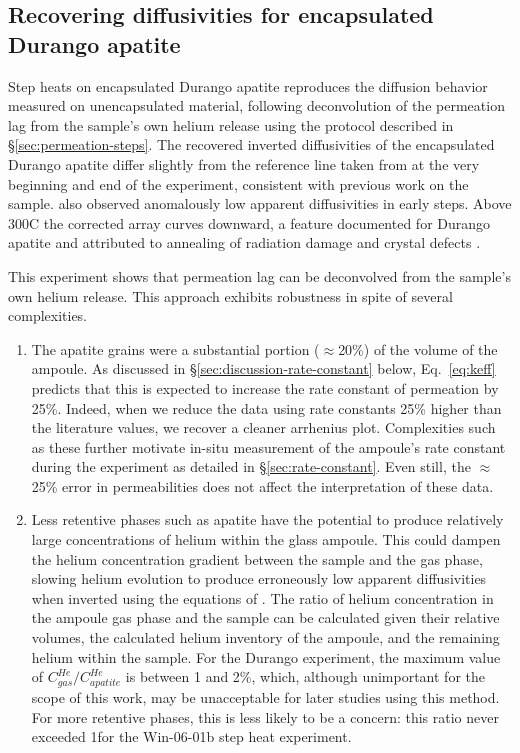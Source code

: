\subsection{Recovering diffusivities for encapsulated Durango apatite}\label{sec:recover-arrhenius}
Step heats on encapsulated Durango apatite reproduces the diffusion behavior measured on unencapsulated material, following deconvolution of the permeation lag from the sample's own helium release using the protocol described in \S\ref{sec:permeation-steps}. 
The recovered inverted diffusivities of the encapsulated Durango apatite differ slightly from the reference line taken from \citet{farley2000} at the very beginning and end of the experiment, consistent with previous work on the sample. \citet{farley2000} also observed anomalously low apparent diffusivities in early steps. Above 300\textdegree C the corrected array curves downward, a feature documented for Durango apatite and attributed to annealing of radiation damage and crystal defects \citep{wolf1996,farley2000,shuster2006}. 

This experiment shows that permeation lag can be deconvolved from the sample's own helium release. This approach exhibits robustness in spite of several complexities.
\begin{enumerate}
\item The apatite grains were a substantial portion ($\approx$20\%) of the volume of the ampoule. As discussed in \S\ref{sec:discussion-rate-constant} below, Eq.~\eqref{eq:keff} predicts that this is expected to increase the rate constant of permeation by 25\%. Indeed, when we reduce the data using rate constants 25\% higher than the literature values, we recover a cleaner arrhenius plot. Complexities such as these further motivate in-situ measurement of the ampoule's rate constant during the experiment as detailed in \S\ref{sec:rate-constant}. Even still, the $\approx$25\% error in permeabilities does not affect the interpretation of these data.
\item Less retentive phases such as apatite have the potential to produce relatively large concentrations of helium within the glass ampoule. This could dampen the helium concentration gradient between the sample and the gas phase, slowing helium evolution to produce erroneously low apparent diffusivities when inverted using the equations of \citet{fechtigkalbitzer1966}. The ratio of helium concentration in the ampoule gas phase and the sample can be calculated given their relative volumes, the calculated helium inventory of the ampoule, and the remaining helium within the sample. For the Durango experiment, the maximum value of $C^{He}_{gas}/C^{He}_{apatite}$ is between 1 and 2\%, which, although unimportant for the scope of this work, may be unacceptable for later studies using this method. For more retentive phases, this is less likely to be a concern: this ratio never exceeded 1\textperthousand for the Win-06-01b step heat experiment. 
\end{enumerate}


